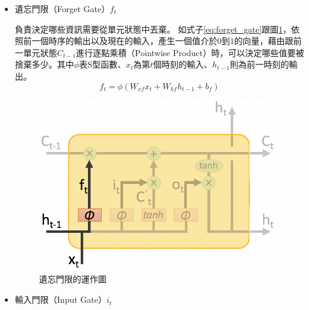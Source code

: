 \begin{itemize}
\item{遺忘門限（Forget Gate）$f_t$}
	
	負責決定哪些資訊需要從單元狀態中丟棄。
	如式子\ref{eq:forget_gate}跟圖\ref{fig:ch2_forget_gate}，依照前一個時序的輸出以及現在的輸入，產生一個值介於$0$到$1$的向量，藉由跟前一單元狀態$C_{t-1}$進行逐點乘積（Pointwise
	Product）時，可以決定哪些值要被捨棄多少。其中$\phi$表S型函數、$x_t$為第$t$個時刻的輸入、$h_{t-1}$則為前一時刻的輸出。
\begin{equation}
\label{eq:forget_gate}
f_t =  \phi( W_{xf} x_t + W_{hf} h_{t-1}+b_f)
\end{equation}
\begin{figure}[ht]
\centering
\includegraphics[scale=0.5]{images/ch2_forget_gate.png}
\caption{遺忘門限的運作圖\cite{shen2016}} \label{fig:ch2_forget_gate}
\end{figure}
\item{輸入門限（Input Gate）$i_t$} 


\end{itemize}

